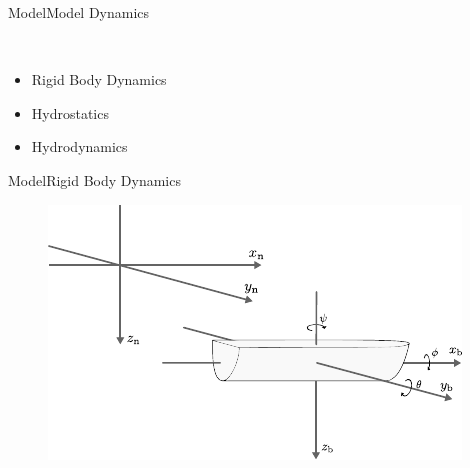 \begin{frame}{Model}{Model Dynamics}
\begin{minipage}{0.3\linewidth}
\begin{figure}[H]
        \end{figure}                
    \end{minipage}\hfill \\
    \begin{itemize}
        \item Rigid Body Dynamics
        \item Hydrostatics
        \item Hydrodynamics
    \end{itemize}
\end{frame}

\begin{frame}{Model}{Rigid Body Dynamics}
    \begin{minipage}{0.65\linewidth}
        \begin{figure}[H]
            \centering
            \includegraphics[width=1\linewidth]{figures/boat3D}
        \end{figure}        
    \end{minipage}\hfill      
    \begin{minipage}{0.3\linewidth}
        \begin{figure}[H]
            \centering

\end{figure}
\end{minipage}
\end{frame}
